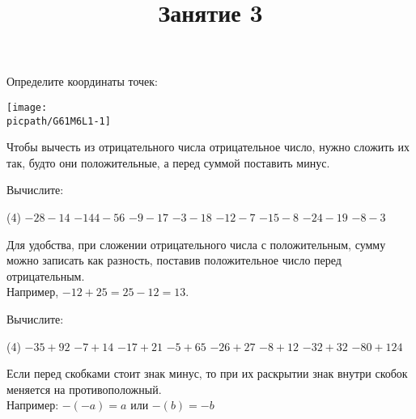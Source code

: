 \begin{class}[number=3-4]
	\title{Занятие 3}
	\begin{listofex}
		\item
		\begin{minipage}[t]{\bodywidth}
			Определите координаты точек:
		\end{minipage}
		\begin{minipage}[c]{0.45\textwidth}
			\texttt{[image: \\picpath/G61M6L1-1]}
		\end{minipage}
	\end{listofex}
	\begin{definit}
	Чтобы вычесть из отрицательного числа отрицательное число, нужно сложить их так, будто они положительные, а перед суммой поставить минус.
	\end{definit}
	\begin{listofex}[resume]
		\item Вычислите:
		\begin{tasks}(4)
			\task \( -28-14 \)
			\task \( -144-56 \)
			\task \( -9-17 \)
			\task \( -3-18 \)
			\task \( -12-7 \)
			\task \( -15-8 \)
			\task \( -24-19 \)
			\task \( -8-3 \)
		\end{tasks}
	\end{listofex}
	\begin{definit}
		Для удобства, при сложении отрицательного числа с положительным, сумму можно записать как разность, поставив положительное число перед отрицательным. \\ Например, \(-12+25=25-12=13\).
	\end{definit}
	\begin{listofex}[resume]
		\item Вычислите:
		\begin{tasks}(4)
			\task \( -35 + 92 \)
			\task \( -7+14 \)
			\task \( -17+21 \)
			\task \( -5+65 \)
			\task \( -26+27 \)
			\task \( -8+12 \)
			\task \( -32+32 \)
			\task \( -80+124 \)
		\end{tasks}
	\end{listofex}
	\begin{definit}
		Если перед скобками стоит знак минус, то при их раскрытии знак внутри скобок меняется на противоположный. \\ Например: \(-(-a) = a \) или \( -(b) = -b \)
	\end{definit}
	\begin{listofex}[resume]

\end{listofex}
\end{class}
